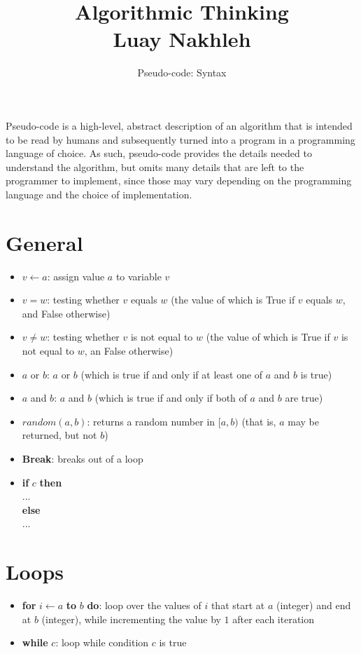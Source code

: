 \documentclass[10pt]{article}
\begin{document}
\title{Algorithmic Thinking\\ Luay Nakhleh}
\author{Pseudo-code: Syntax}
\date{}
\maketitle



Pseudo-code is a high-level, abstract description of an algorithm that is intended to be read by humans and subsequently turned into 
a program in a programming language of choice. As such, pseudo-code provides the details needed to understand the algorithm, but omits 
many details that are left to the programmer to implement, since those may vary depending on the programming language and the choice 
of implementation. 

\section{General}
\begin{itemize}
\item {\color{blue} $v \leftarrow a$}: assign value $a$ to variable $v$
\item {\color{blue} $v = w$}: testing whether $v$ equals $w$ (the value of which is True if $v$ equals $w$, and False otherwise)
\item {\color{blue} $v \neq w$}: testing whether $v$ is not equal to $w$ (the value of which is True if $v$ is not equal to $w$, an False otherwise)
\item {\color{blue} $a$ or $b$}: $a$ or $b$ (which is true if and only if at least one of $a$ and $b$ is true)
\item {\color{blue} $a$ and $b$}: $a$ and $b$ (which is true if and only if both of $a$ and $b$ are true)
\item {\color{blue} $random(a,b)$}: returns a random number in $[a,b)$ (that is, $a$ may be returned, but not $b$)
\item {\color{blue} {\bf Break}}: breaks out of a loop
\item {\color{blue} {\bf if} $c$ {\bf then} \\
  ... \\
  {\bf else}\\
   ...} 
\end{itemize}


\section{Loops}
\begin{itemize}
\item {\color{blue} {\bf for} $i\leftarrow a$ {\bf to} $b$ {\bf do}}: loop over the values of $i$ that start at $a$ (integer) and end at $b$ (integer), while incrementing the value by $1$ after each iteration
\item {\color{blue} {\bf while} $c$}: loop while condition $c$ is true 
\end{itemize}
\end{document}
